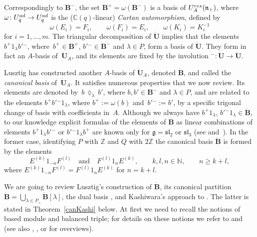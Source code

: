 \documentclass[11pt]{article}
\numberwithin{equation}{section}
\numberwithin{equation}{section}
\theoremstyle{definition}
\newcommand{\mc}{\mathbb{C}}
\newcommand{\mz}{\mathbb{Z}}
\newcommand{\mn}{\mathbb{N}}
\newcommand{\ra}{\rightarrow}
\begin{document}
Correspondingly to $\mathbf{B}^-$, the set $\mathbf{B}^+ = \omega(\mathbf{B}^-)$ is a basis of $U_A^{\rm res}(\mathfrak{n}_+)$, where $\omega\colon U_q^{\rm ad} \ra U_q^{\rm ad}$ is the ($\mc(q)$-linear) {\it Cartan automorphism}, defined by
\[\omega(E_i)=F_i , \qquad \omega(F_i) = E_i , \qquad \omega(K_i)=K_i^{-1}\]
for $i=1,\dots,m$. The triangular decomposition of $\dot{\mathbf{U}}$ implies that the elements $b^+1_\lambda b'{}^-$, where~${b^+ \in \mathbf{B}^+}$, $b'{}^- \in \mathbf{B}^-$ and $\lambda\in P$, form a basis of $\dot{\mathbf{U}}$. They form in fact an $A$-basis of~$\dot{\mathbf{U}}_A$, and its elements are fixed by the involution ${}^-\colon \dot{\mathbf{U}} {}\ra{} \dot{\mathbf{U}}$.

Lusztig has constructed another $A$-basis of $\dot{\mathbf{U}}_A$, denoted $\dot{\mathbf{B}}$, and called the {\it canonical basis} of~$\dot{\mathbf{U}}_A$. It satisfies numerous properties that we now review. Its elements are denoted by~${b\,\lozenge_\lambda\, b'}$, where $b, b' \in \mathbf{B}^-$ and $\lambda\in P$, and are related to the elements $b^+b'{}^-1_\lambda$, where $b^+ := \omega(b)$ and~${b'{}^-:=b'}$, by a specific trigonal change of basis with coefficients in~$A$. Although we always have $b^+1_\lambda$, $b'{}^-1_\lambda \in \dot{\mathbf{B}}$, to our knowledge explicit formulas of the elements of $\dot{\mathbf{B}}$ as linear combinations of elements $b^+1_\lambda b'{}^-$ or $b'{}^- 1_\lambda b^+$ are known only for $\mathfrak{g}={\mathfrak{sl}_2}$ or $\mathfrak{sl}_3$ (see \cite[Section~25.3]{Lusztig} and~\cite{Cui}). In the former case, identifying $P$ with $\mz$ and $Q$ with $2\mz$ the canonical basis $\dot{\mathbf{B}}$ is formed by the elements
\[%
E^{(k)}1_{-n}F^{(l)}\quad \text{and}\quad F^{(l)}1_nE^{(k)}, \qquad k,l,n\in \mn,\qquad n\geq k+l,
\]
where $E^{(k)}1_{-n}F^{(l)} = F^{(l)}1_nE^{(k)}$ for $n=k+l$.

We are going to review Lusztig's construction of $\dot{\mathbf{B}}$, its canonical partition $\dot{\mathbf{B}} = \bigcup_{\lambda\in P_+} \dot{\mathbf{B}} [\lambda]$, the dual basis , and Kashiwara's approach to  \cite{Kashiwara2,Kashiwara3}. The latter is stated in Theorem~\ref{canKashi} below. At first we need to recall the notions of based module and balanced triple; for details on these notions we refer to \cite[Chapter~27]{Lusztig} and \cite{Kashiwara2} (see also \cite{Kashiwara4}, \cite[Sections~3.15 and~3.16]{VY}, or \cite[Chapter~14]{CP} for overviews).
\end{document}
